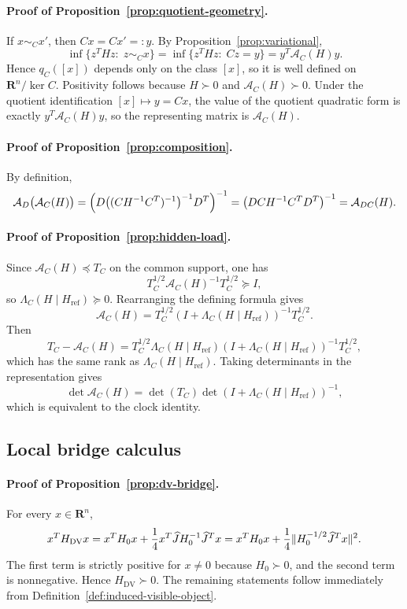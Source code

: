 \documentclass[11pt,a4paper]{article}
\numberwithin{equation}{section}
\DeclarePairedDelimiter{\norm}{\lVert}{\rVert}
\newcommand{\R}{\mathbf R}
\newcommand{\Aobs}{\mathcal A}
\theoremstyle{thmcompact}
\theoremstyle{remark}
\begin{document}
\paragraph{Proof of Proposition~\ref{prop:quotient-geometry}.}
If \(x\sim_C x'\), then \(Cx=Cx'=:y\). By Proposition~\ref{prop:variational},
\[
\inf\{z^THz:\;z\sim_C x\}
=
\inf\{z^THz:\;Cz=y\}
=
y^T\Aobs_C(H)y.
\]
Hence \(q_C([x])\) depends only on the class \([x]\), so it is well defined on \(\R^n/\ker C\). Positivity follows because \(H\succ0\) and \(\Aobs_C(H)\succ0\). Under the quotient identification \([x]\mapsto y=Cx\), the value of the quotient quadratic form is exactly \(y^T\Aobs_C(H)y\), so the representing matrix is \(\Aobs_C(H)\).

\paragraph{Proof of Proposition~\ref{prop:composition}.}
By definition,
\[
\Aobs_D\bigl(\Aobs_C(H)\bigr)
=
\Bigl(D\bigl((CH^{-1}C^T)^{-1}\bigr)^{-1}D^T\Bigr)^{-1}
=
\bigl(DCH^{-1}C^TD^T\bigr)^{-1}
=
\Aobs_{DC}(H).
\]

\paragraph{Proof of Proposition~\ref{prop:hidden-load}.}
Since \(\Aobs_C(H)\preceq T_C\) on the common support, one has
\[
T_C^{1/2}\Aobs_C(H)^{-1}T_C^{1/2}\succeq I,
\]
so \(\Lambda_C(H\mid H_{\mathrm{ref}})\succeq0\). Rearranging the defining formula gives
\[
\Aobs_C(H)=T_C^{1/2}(I+\Lambda_C(H\mid H_{\mathrm{ref}}))^{-1}T_C^{1/2}.
\]
Then
\[
T_C-\Aobs_C(H)
=
T_C^{1/2}\Lambda_C(H\mid H_{\mathrm{ref}})(I+\Lambda_C(H\mid H_{\mathrm{ref}}))^{-1}T_C^{1/2},
\]
which has the same rank as \(\Lambda_C(H\mid H_{\mathrm{ref}})\). Taking determinants in the representation gives
\[
\det\Aobs_C(H)=\det(T_C)\det(I+\Lambda_C(H\mid H_{\mathrm{ref}}))^{-1},
\]
which is equivalent to the clock identity.

\subsection{Local bridge calculus}

\paragraph{Proof of Proposition~\ref{prop:dv-bridge}.}
For every \(x\in\R^n\),
\[
x^TH_{\mathrm{DV}}x
=
x^TH_0x+\frac14 x^T\widehat J H_0^{-1}\widehat J^T x
=
x^TH_0x+\frac14 \norm{H_0^{-1/2}\widehat J^T x}^2.
\]
The first term is strictly positive for \(x\neq0\) because \(H_0\succ0\), and the second term is nonnegative. Hence \(H_{\mathrm{DV}}\succ0\). The remaining statements follow immediately from Definition~\ref{def:induced-visible-object}.
\end{document}

